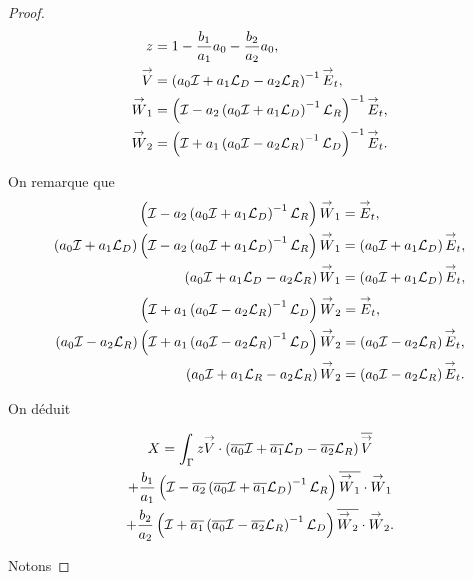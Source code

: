 \begin{proof}
    \newcommand{\vV}{\vect{V}}
    \newcommand{\vW}{\vect{W}}

    \begin{align*}
      z &= 1-\frac{b_1}{a_1}a_0 -\frac{b_2}{a_2}a_0,
      \\
      \vV & = \left(a_0\oI  + a_1 \LD - a_2\LR \right)^{-1} \vE_t,
      \\
      \vW_1 & = \left( \oI - a_2 \left( a_0\oI + a_1\LD\right)^{-1}\LR\right)^{-1} \vE_t,
      \\
      \vW_2 & = \left( \oI + a_1 \left( a_0\oI - a_2\LR\right)^{-1}\LD\right)^{-1} \vE_t.
    \end{align*}

    On remarque que
    \begin{align*}
      \left( \oI - a_2 \left( a_0\oI + a_1\LD\right)^{-1}\LR\right)\vW_1 &= \vE_t,
      \\
      \left( a_0\oI + a_1 \LD \right)\left( \oI - a_2 \left( a_0\oI + a_1\LD\right)^{-1}\LR\right)\vW_1&= \left( a_0\oI + a_1 \LD \right)\vE_t,
      \\
      \left( a_0\oI + a_1 \LD - a_2 \LR\right)\vW_1 &= \left( a_0\oI + a_1 \LD \right)\vE_t,
    \end{align*}
    \begin{align*}
      \left( \oI + a_1 \left( a_0\oI - a_2\LR\right)^{-1}\LD\right)\vW_2 &= \vE_t,
      \\
      \left( a_0\oI - a_2 \LR \right)\left( \oI + a_1 \left( a_0\oI - a_2\LR\right)^{-1}\LD\right)\vW_2&= \left( a_0\oI - a_2 \LR \right)\vE_t,
      \\
      \left( a_0\oI + a_1 \LR - a_2 \LR\right)\vW_2 &= \left( a_0\oI - a_2 \LR \right)\vE_t.
    \end{align*}

    On déduit

    \begin{multline*}
      X = \int_\Gamma z \vV \cdot \left(\conj{a_0}\oI  + \conj{a_1} \LD - \conj{a_2}\LR\right)\conj{\vV}
      \\
      + \frac{b_1}{a_1} \left( \oI - \conj{a_2} \left( \conj{a_0}\oI + \conj{a_1}\LD\right)^{-1}\LR\right)\conj{\vW_1}\cdot\vW_1
      \\
      + \frac{b_2}{a_2} \left( \oI + \conj{a_1} \left( \conj{a_0}\oI - \conj{a_2}\LR\right)^{-1}\LD\right)\conj{\vW_2}\cdot\vW_2.
    \end{multline*}

    Notons

    \newcommand{\vR}{\vect{R}}


\end{proof}

